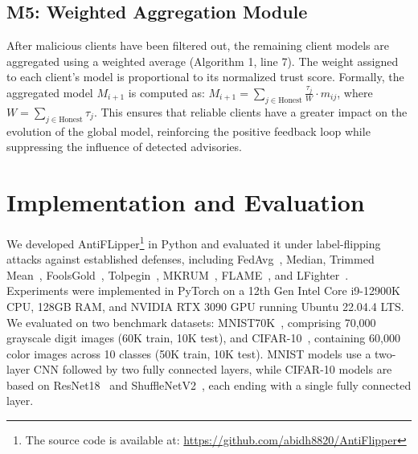 \documentclass[conference]{IEEEtran}
\begin{document}
 \subsection{M5: Weighted Aggregation Module}
After malicious clients have been filtered out, the remaining client models are aggregated using a weighted average (Algorithm 1, line 7). The weight assigned to each client's model is proportional to its normalized trust score. Formally, the aggregated model $M_{i+1}$ is computed as: \(
M_{i+1} = \sum_{j \in \text{Honest}} \frac{\tau_j}{W} \cdot m_{ij} \), where $W = \sum_{j \in \text{Honest}} \tau_j$. This ensures that reliable clients have a greater impact on the evolution of the global model, reinforcing the positive feedback loop while suppressing the influence of detected advisories.

\section{Implementation and Evaluation}
\label{sec:implement&eval}

We developed AntiFLipper\footnote{The source code is available at: \url{https://github.com/abidh8820/AntiFlipper}} in Python and evaluated it under label-flipping attacks against established defenses, including FedAvg~\cite{fedavg-pmlr-v54-mcmahan17a}, Median, Trimmed Mean~\cite{yin2018byzantine}, FoolsGold~\cite{fung2020limitations}, Tolpegin~\cite{tolpegin2020data}, MKRUM~\cite{NIPS2017_f4b9ec30}, FLAME~\cite{nguyen2022flame}, and LFighter~\cite{jebreel2024lfighter}. Experiments were implemented in PyTorch on a 12th Gen Intel Core i9-12900K CPU, 128GB RAM, and NVIDIA RTX 3090 GPU running Ubuntu 22.04.4 LTS. We evaluated on two benchmark datasets: MNIST70K~\cite{MNIST-lecun1998gradient}, comprising 70,000 grayscale digit images (60K train, 10K test), and CIFAR-10~\cite{CIFAR-krizhevsky2009learning}, containing 60,000 color images across 10 classes (50K train, 10K test). MNIST models use a two-layer CNN followed by two fully connected layers, while CIFAR-10 models are based on ResNet18~\cite{resnet-he2016deep} and ShuffleNetV2~\cite{shufflenetV2-ma2018shufflenet}, each ending with a single fully connected layer.
\end{document}
